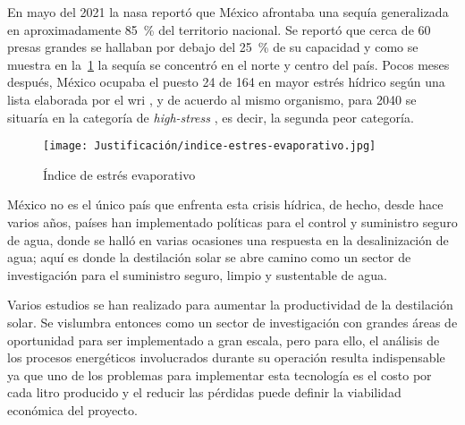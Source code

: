 	En mayo del 2021 la \acrfull{nasa} reportó que México afrontaba una sequía generalizada en aproximadamente \qty{85}{\percent} del territorio nacional. Se reportó que cerca de 60 presas grandes se hallaban por debajo del \qty{25}{\percent} de su capacidad y como se muestra en la~\cref{fig:indice-estres-evaporativo} la sequía se concentró en el norte y centro del país. Pocos meses después, México ocupaba el puesto 24 de 164 en mayor estrés hídrico según una lista elaborada por el \acrshort{wri} \cite{efe_empeora_2021}, y de acuerdo al mismo organismo, para 2040 se situaría en la categoría de \textit{high-stress} \cite{maddocks_ranking_2015}, es decir, la segunda peor categoría.

	\begin{figure}[H]
		\centering
		\texttt{[image: Justificación/indice-estres-evaporativo.jpg]}
		\caption{Índice de estrés evaporativo}
		\label{fig:indice-estres-evaporativo}
	\end{figure}
	
	México no es el único país que enfrenta esta crisis hídrica, de hecho, desde hace varios años, países han implementado políticas para el control y suministro seguro de agua, donde se halló en varias ocasiones una respuesta en la desalinización de agua; aquí es donde la destilación solar se abre camino como un sector de investigación para el suministro seguro, limpio y sustentable de agua.
	
	Varios estudios se han realizado para aumentar la productividad de la destilación solar. Se vislumbra entonces como un sector de investigación con grandes áreas de oportunidad para ser implementado a gran escala, pero para ello, el análisis de los procesos energéticos involucrados durante su operación resulta indispensable ya que uno de los problemas para implementar esta tecnología es el costo por cada litro producido y el reducir las pérdidas puede definir la viabilidad económica del proyecto.
	
